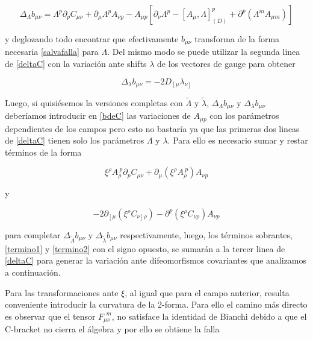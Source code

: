 \documentclass{article}
\numberwithin{equation}{section}
\begin{document}
\begin{equation}
\Delta_{\Lambda} b_{\mu \nu} = \Lambda^p \partial_p C_{\mu \nu} + \partial_{\mu} \Lambda^p A_{\nu p} - A_{\mu p } \left[ \partial_{\nu} \Lambda^p - \left[A_{\mu}, \Lambda \right]_{(D)}^p + \partial^p \left( \Lambda^m A_{\mu m} \right) \right]
\end{equation} 

y deglozando todo encontrar que efectivamente $ b_{\mu \nu} $ transforma de la forma necesaria \ref{salvafalla} para $ \Lambda $. Del mismo modo se puede utilizar la segunda linea de \ref{deltaC}
con la variación ante shifts $ \lambda $ de los vectores de gauge para obtener

\begin{equation}\label{Deltablambda}
\Delta_{\lambda} b_{\mu \nu } = - 2 D_{\left[\mu \right.} \lambda_{\left.\nu \right]} 
\end{equation}

Luego, si quisiésemos la versiones completas con $ \widetilde{\Lambda} $ y $ \widetilde{\lambda} $, $ \Delta_{\Lambda} b_{\mu \nu } $ y $ \Delta_{\lambda} b_{\mu \nu } $  deberíamos introducir en \ref{bdeC} las variaciones de $ A_{\mu p} $ con los parámetros dependientes de los campos pero esto no bastaría ya que las primeras dos lineas de \ref{deltaC} tienen solo los parámetros $ \Lambda $ y $ \lambda $. Para ello es necesario sumar y restar términos de la forma

\begin{equation}\label{termino1}
\xi^{\rho} A_{\rho}^{\ p} \partial_p C_{\mu \nu} + \partial_{\mu} \left(\xi^{\rho} A_{\rho}^{\ p} \right) A_{\nu p}
\end{equation}

y

\begin{equation}\label{termino2}
-2 \partial_{\left[\mu \right.} \left( \xi^{\rho} C_{\left. \nu \right] \rho} \right) - \partial^p \left(\xi^{\rho} C_{\nu \rho}\right) A_{\nu p}
\end{equation}

para completar $ \Delta_{\widetilde{\Lambda}}b_{\mu \nu} $ y $ \Delta_{\widetilde{\lambda}}b_{\mu \nu} $ respectivamente, luego, los términos sobrantes, \ref{termino1} y \ref{termino2} con el signo opuesto, se sumarán a la tercer linea de \ref{deltaC} para generar la variación ante difeomorfismos covariantes que analizamos a continuación.

Para las transformaciones ante $ \xi $, al igual que para el campo anterior, resulta conveniente introducir la curvatura de la 2-forma. Para ello el camino más directo es observar que el tensor $ F_{\mu \nu}^{\ \ m} $, no satisface la identidad de Bianchi debido a que el C-bracket no cierra el álgebra y por ello se obtiene la falla
\end{document}
